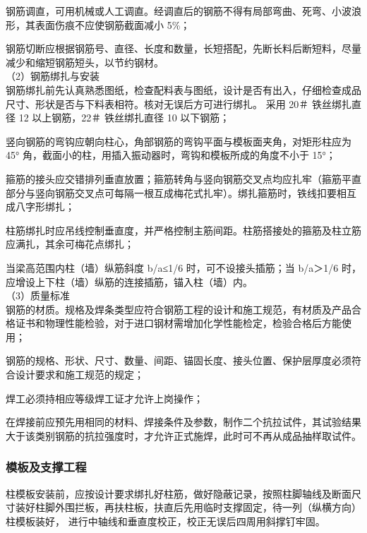  钢筋调直，可用机械或人工调直。经调直后的钢筋不得有局部弯曲、死弯、小波浪形，其表面伤痕不应使钢筋截面减小 5\%；

 钢筋切断应根据钢筋号、直径、长度和数量，长短搭配，先断长料后断短料，尽量减少和缩短钢筋短头，以节约钢材。\\


（2）钢筋绑扎与安装\\

钢筋绑扎前先认真熟悉图纸，检查配料表与图纸，设计是否有出入，仔细检查成品尺寸、形状是否与下料表相符。核对无误后方可进行绑扎。
采用 20＃ 铁丝绑扎直径 12 以上钢筋，22＃ 铁丝绑扎直径 10 以下钢筋；

 竖向钢筋的弯钩应朝向柱心，角部钢筋的弯钩平面与模板面夹角，对矩形柱应为 45° 角，截面小的柱，用插入振动器时，弯钩和模板所成的角度不小于 15°；

 箍筋的接头应交错排列垂直放置；箍筋转角与竖向钢筋交叉点均应扎牢（箍筋平直部分与竖向钢筋交叉点可每隔一根互成梅花式扎牢）。绑扎箍筋时，铁线扣要相互成八字形绑扎；

 柱筋绑扎时应吊线控制垂直度，并严格控制主筋间距。柱筋搭接处的箍筋及柱立筋应满扎，其余可梅花点绑扎；

 当梁高范围内柱（墙）纵筋斜度 b/a≤1/6 时，可不设接头插筋；当 b/a＞1/6 时，应增设上下柱（墙）纵筋的连接插筋，锚入柱（墙）内。 \\

（3）质量标准\\

 钢筋的材质。规格及焊条类型应符合钢筋工程的设计和施工规范，有材质及产品合格证书和物理性能检验，对于进口钢材需增加化学性能检定，检验合格后方能使用；

 钢筋的规格、形状、尺寸、数量、间距、锚固长度、接头位置、保护层厚度必须符合设计要求和施工规范的规定；

 焊工必须持相应等级焊工证才允许上岗操作；

 在焊接前应预先用相同的材料、焊接条件及参数，制作二个抗拉试件，其试验结果大于该类别钢筋的抗拉强度时，才允许正式施焊，此时可不再从成品抽样取试件。


\subsubsection{模板及支撑工程}

柱模板安装前，应按设计要求绑扎好柱筋，做好隐蔽记录，按照柱脚轴线及断面尺寸装好柱脚外围拦板，再扶柱板，扶直后先用临时支撑固定，待一列（纵横方向）柱模板装好，
进行中轴线和垂直度校正，校正无误后四周用斜撑钉牢固。

